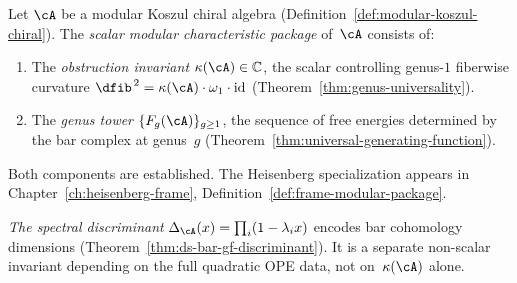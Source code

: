 \begin{definition}
\label{def:modular-characteristic-package}
\label{def:scalar-modular-package}
Let $\cA$ be a modular Koszul chiral algebra
(Definition~\ref{def:modular-koszul-chiral}).  The
\emph{scalar modular characteristic package} of~$\cA$ consists of:
\begin{enumerate}[label=\textup{(\roman*)}]
\item The \emph{obstruction invariant}
  $\kappa(\cA) \in \mathbb{C}$, the scalar controlling genus-$1$
  fiberwise curvature $\dfib^{\,2} = \kappa(\cA) \cdot \omega_1 \cdot \operatorname{id}$
  (Theorem~\ref{thm:genus-universality}).
\item The \emph{genus tower} $\{F_g(\cA)\}_{g \geq 1}$, the sequence
  of free energies determined by the bar complex at genus~$g$
  (Theorem~\ref{thm:universal-generating-function}).
\end{enumerate}
Both components are established.  The Heisenberg specialization
appears in Chapter~\ref{ch:heisenberg-frame},
Definition~\ref{def:frame-modular-package}.

\smallskip
\emph{The spectral discriminant}
$\Delta_{\cA}(x) = \prod_i (1 - \lambda_i x)$
encodes bar cohomology dimensions
(Theorem~\ref{thm:ds-bar-gf-discriminant}).
It is a separate non-scalar invariant depending on
the full quadratic OPE data, not
on~$\kappa(\cA)$ alone.
\end{definition}

